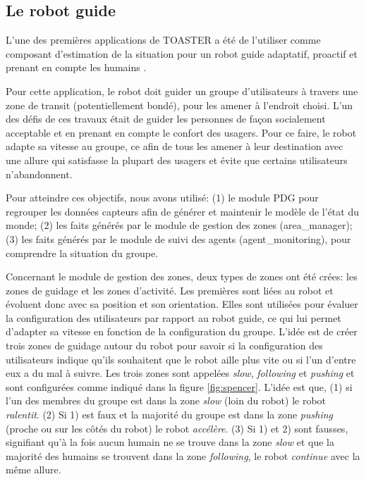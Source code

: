 \documentclass[a4paper,11pt,twoside]{StyleThese}
\begin{document}
\subsection{Le robot guide}

L'une des premières applications de TOASTER a été de l'utiliser comme composant d'estimation de la situation pour un robot guide adaptatif, proactif et prenant en compte les humains \cite{fioreicsr2015}.

Pour cette application, le robot doit guider un groupe d'utilisateurs à travers une zone de transit (potentiellement bondé), pour les amener à l'endroit choisi.
L'un des défis de ces travaux était de guider les personnes de façon socialement acceptable et en prenant en compte le confort des usagers.
Pour ce faire, le robot adapte sa vitesse au groupe, ce afin de tous les amener à leur destination avec une allure qui satisfasse la plupart des usagers et évite que certains utilisateurs n'abandonnent.

Pour atteindre ces objectifs, nous avons utilisé: (1) le module PDG pour regrouper les données capteurs afin de générer et maintenir le modèle de l'état du monde; (2) les faits générés par le module de gestion des zones (area\_manager); (3) les faits générés par le module de suivi des agents (agent\_monitoring), pour comprendre la situation du groupe. 

Concernant le module de gestion des zones, deux types de zones ont été crées: les zones de guidage et les zones d'activité. Les premières sont liées au robot et évoluent donc avec sa position et son orientation. Elles sont utilisées pour évaluer la configuration des utilisateurs par rapport au robot guide, ce qui lui permet d'adapter sa vitesse en fonction de la configuration du groupe.
L'idée est de créer trois zones de guidage autour du robot pour savoir si la configuration des utilisateurs indique qu'ils souhaitent que le robot aille plus vite ou si l'un d'entre eux a du mal à suivre.
Les trois zones sont appelées \textit{slow}, \textit{following} et \textit{pushing} et sont configurées comme indiqué dans la figure \ref{fig:spencer}.
L'idée est que, (1) si l'un des membres du groupe est dans la zone \textit{slow} (loin du robot) le robot \textit{ralentit}. (2) Si 1) est faux et la majorité du groupe est dans la zone \textit{pushing} (proche ou sur les côtés du robot) le robot \textit{accélère}. (3) Si 1) et 2) sont fausses, signifiant qu'à la fois aucun humain ne se trouve dans la zone \textit{slow} et que la majorité des humains se trouvent dans la zone \textit{following}, le robot \textit{continue} avec la même allure.
\end{document}
